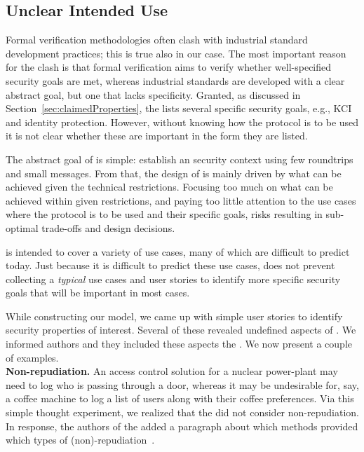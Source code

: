 \documentclass[runningheads, envcountsame, a4paper, draft, x11names]{llncs}
\newcommand{\runhead}[1]{\noindent\textbf{#1. }}
\begin{document}
\subsection{Unclear Intended Use}
\label{sec:unclearProtocolUse}
Formal verification methodologies often clash with industrial standard
development practices; this is true also in our case.
%
The most important reason for the clash is that formal verification aims to
verify whether well-specified security goals are met, whereas industrial
standards are developed with a clear abstract goal,
but one that lacks specificity.
%
Granted, as discussed in Section~\ref{sec:claimedProperties}, the \mSpec{} lists
several specific security goals, e.g., KCI and identity protection.
%
However, without knowing how the protocol is to be used
it is not clear whether these are important in the form they are listed.
%

The abstract goal of \mEdhoc{} is simple: establish an \mOscore{} security
context using few roundtrips and small messages.
%
From that, the design of \mEdhoc{} is mainly driven by what
can be achieved given the technical restrictions.
%
Focusing too much on what can be achieved within given restrictions, and paying
too little attention to the use cases where the
protocol is to be used and their specific goals, risks resulting in
sub-optimal trade-offs and design decisions.
%

\mEdhoc{} is intended to cover a variety of use cases, many of which are
difficult to predict today.
%
Just because it is difficult to predict these use cases, does not
prevent collecting a \emph{typical} use cases and user stories
to identify more specific security goals that will be important in most cases.
%

While constructing our model, we came up with simple user stories to identify
security properties of interest.
%
Several of these revealed undefined aspects of \mEdhoc{}.
%
We informed \mEdhoc{} authors and they included these aspects the \mSpec{}.
%
We now present a couple of examples.\\
%

\runhead{Non-repudiation}
An access control solution for a nuclear power-plant may need to log who is
passing through a door, whereas it may be undesirable for, say, a coffee
machine to log a list of users along with their coffee preferences.
%
Via this simple thought experiment, we realized that the \mSpec{} did not
consider non-repudiation.
%
In response, the authors of the \mSpec{} added a paragraph about which methods
provided which types of (non)-repudiation~\cite{personalCommunication}. \\
\end{document}
